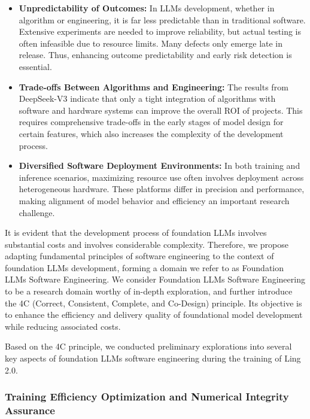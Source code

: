 \begin{itemize}[leftmargin=1.5em]
    \item \textbf{Unpredictability of Outcomes:} In LLMs development, whether in algorithm or engineering, it is far less predictable than in traditional software. Extensive experiments are needed to improve reliability, but actual testing is often infeasible due to resource limits. Many defects only emerge late in release. Thus, enhancing outcome predictability and early risk detection is essential.
    
    \item \textbf{Trade-offs Between Algorithms and Engineering:} The results from DeepSeek-V3 indicate that only a tight integration of algorithms with software and hardware systems can improve the overall ROI of projects. This requires comprehensive trade-offs in the early stages of model design for certain features, which also increases the complexity of the development process.

    \item \textbf{Diversified Software Deployment Environments:} In both training and inference scenarios, maximizing resource use often involves deployment across heterogeneous hardware. These platforms differ in precision and performance, making alignment of model behavior and efficiency an important research challenge.
\end{itemize}


It is evident that the development process of foundation LLMs involves substantial costs and involves considerable complexity. Therefore, we propose adapting fundamental principles of software engineering to the context of foundation LLMs development, forming a domain we refer to as Foundation LLMs Software Engineering.
We consider Foundation LLMs Software Engineering to be a research domain worthy of in-depth exploration, and further introduce the 4C (Correct, Consistent, Complete, and Co-Design) principle. Its objective is to enhance the efficiency and delivery quality of foundational model development while reducing associated costs.

Based on the 4C principle, we conducted preliminary explorations into several key aspects of foundation LLMs software engineering during the training of Ling 2.0.

\subsubsection{Training Efficiency Optimization and Numerical Integrity Assurance}

